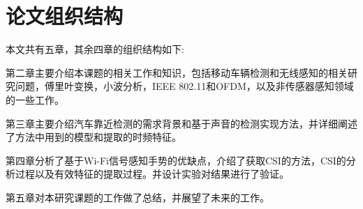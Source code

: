 \section{论文组织结构}

本文共有五章，其余四章的组织结构如下:

第二章主要介绍本课题的相关工作和知识，包括移动车辆检测和无线感知的相关研究问题，傅里叶变换，小波分析，IEEE 802.11和OFDM，以及非传感器感知领域的一些工作。

第三章主要介绍汽车靠近检测的需求背景和基于声音的检测实现方法，并详细阐述了方法中用到的模型和提取的时频特征。

第四章分析了基于Wi-Fi信号感知手势的优缺点，介绍了获取CSI的方法，CSI的分析过程以及有效特征的提取过程。并设计实验对结果进行了验证。

第五章对本研究课题的工作做了总结，并展望了未来的工作。








